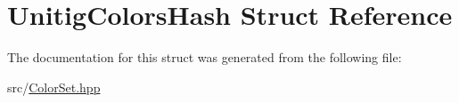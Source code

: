 \hypertarget{structUnitigColorsHash}{}\section{Unitig\+Colors\+Hash Struct Reference}
\label{structUnitigColorsHash}


The documentation for this struct was generated from the following file\+:\begin{DoxyCompactItemize}
\item 
src/\hyperlink{ColorSet_8hpp}{Color\+Set.\+hpp}\end{DoxyCompactItemize}
